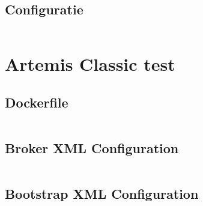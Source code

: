 \subsection{Configuratie}\label{sec:config_rabbitmq}
\inputminted{python3}{../tests/messaging/rabbitmq-server/rabbitmq.conf}


\section{Artemis Classic test}\label{sec:code_artemis}

\subsection{Dockerfile}\label{sec:docker_artemis}
\inputminted{python3}{../tests/messaging/artemis-server/Dockerfile}

\subsection{Broker XML Configuration}\label{sec:broker_artemis}
\inputminted{xml}{../tests/messaging/artemis-server/broker.xml}

\subsection{Bootstrap XML Configuration}\label{sec:bootstrap_artemis}
\inputminted{xml}{../tests/messaging/artemis-server/bootstrap.xml}

